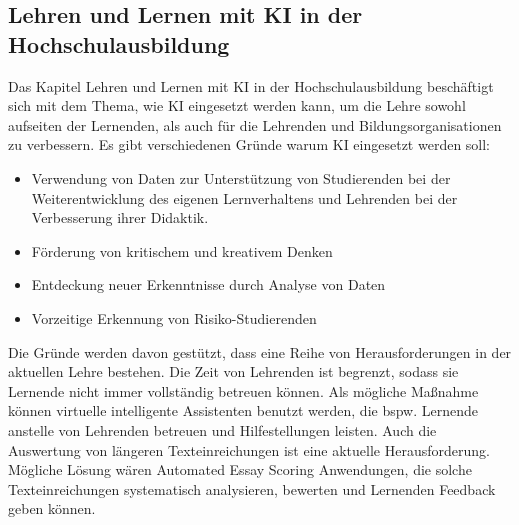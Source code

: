 \subsection{Lehren und Lernen mit KI in der Hochschulausbildung}
Das Kapitel \glqq{}Lehren und Lernen mit KI in der Hochschulausbildung\grqq{} beschäftigt sich mit dem Thema, wie \ac{KI} eingesetzt werden kann, um die Lehre sowohl aufseiten der Lernenden, als auch für die Lehrenden und Bildungsorganisationen zu verbessern. Es gibt verschiedenen Gründe warum \ac{KI} eingesetzt werden soll: \cite*[S. 11f]{Witt.2020}
\begin{itemize}
      \item Verwendung von Daten zur Unterstützung von Studierenden bei der Weiterentwicklung des eigenen Lernverhaltens und Lehrenden bei der Verbesserung ihrer Didaktik. \cite*[S. 11]{Witt.2020}
      \item Förderung von kritischem und kreativem Denken \cite*[S. 11]{Witt.2020}
      \item Entdeckung neuer Erkenntnisse durch Analyse von Daten \cite*[S. 11]{Witt.2020}
      \item Vorzeitige Erkennung von Risiko-Studierenden \cite*[S. 11]{Witt.2020}
\end{itemize}
\noindent
Die Gründe werden davon gestützt, dass eine Reihe von Herausforderungen in der aktuellen Lehre bestehen.
Die Zeit von Lehrenden ist begrenzt, sodass sie Lernende nicht immer vollständig betreuen können.
Als mögliche Maßnahme können virtuelle intelligente Assistenten benutzt werden, die bspw. Lernende anstelle von Lehrenden betreuen und Hilfestellungen leisten.
Auch die Auswertung von längeren Texteinreichungen ist eine aktuelle Herausforderung.
Mögliche Lösung wären Automated Essay Scoring Anwendungen, die solche Texteinreichungen systematisch analysieren, bewerten und Lernenden Feedback geben können. \cite*[S. 12]{Witt.2020}

